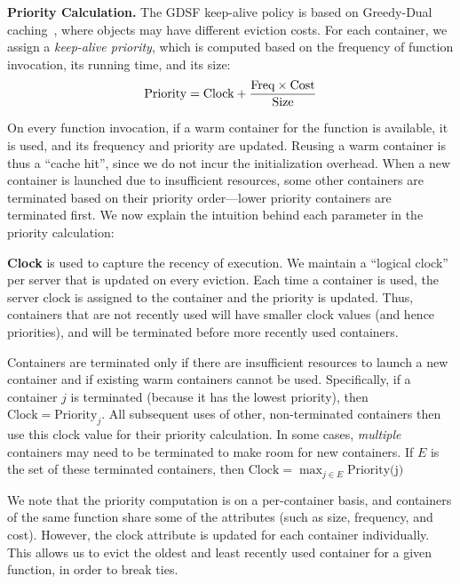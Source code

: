 \noindent \textbf{Priority Calculation.} 
The GDSF keep-alive policy is based on Greedy-Dual  caching~\cite{young_gd_orig_94}, where objects may have  different eviction costs. 
%
For each container, we assign a \emph{keep-alive priority}, which is computed based on the frequency of function invocation, its running time, and its size:
%
\vspace*{-7pt}
\begin{equation}
  \vspace*{-3pt}
  \text{Priority} = \text{Clock} + \frac{\text{Freq} \times \text{Cost}} {\text{Size}}
    \label{eq:prio-prop}
\end{equation}
%
% 

On every function invocation, if a warm container for the function is available, it is used, and its frequency and priority are updated.
Reusing a warm container is thus a ``cache hit'', since we do not incur the initialization overhead. 
When a new container is launched due to insufficient resources, some other containers are terminated based on their priority order---lower priority containers are terminated first. 
We now explain the intuition behind each parameter in the priority calculation:



\noindent \textbf{Clock} is used to capture the recency of execution.
We maintain a ``logical clock'' per server that is updated on every eviction. 
Each time a container is used, the server clock is assigned to the container and the priority is updated.  
Thus, containers that are not recently used will have smaller clock values (and hence priorities), and will be terminated before more recently used containers. 

Containers are terminated only if there are insufficient resources to launch a new container and if existing warm containers cannot be used.  
Specifically, if a container  $j$ is terminated (because it has the lowest priority), then $\text{Clock} = \text{Priority}_j$.
All subsequent uses of other, non-terminated containers then use this clock value for their priority calculation.
In some cases, \emph{multiple} containers may need to be terminated to make room for new containers.
If $E$ is the set of these terminated containers, then $\text{Clock} = \max_{j \in E}{\text{Priority(j)}}$

We note that the priority computation is on a per-container basis, and containers of the same function share some of the attributes (such as size, frequency, and cost). 
However, the clock attribute is updated for each container individually. 
This allows us to evict the oldest and least recently used container for a given function, in order to break ties. 


